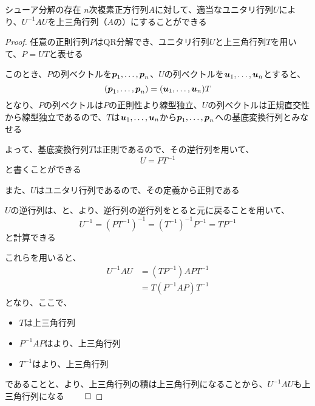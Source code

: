 \documentclass[../../../topic_linear-algebra]{subfiles}
\begin{document}
\begin{theorem*}{シューア分解の存在}
  $n$次複素正方行列$A$に対して、適当なユニタリ行列$U$により、$U^{-1}AU$を上三角行列（$A$の）にすることができる
\end{theorem*}

\begin{proof}
  任意の正則行列$P$はQR分解でき、ユニタリ行列$U$と上三角行列$T$を用いて、$P = UT$と表せる

  このとき、$P$の列ベクトルを$\vb*{p}_1,\ldots,\vb*{p}_n$、$U$の列ベクトルを$\vb*{u}_1,\ldots,\vb*{u}_n$とすると、
  \begin{equation*}
    (\vb*{p}_1,\ldots,\vb*{p}_n) = (\vb*{u}_1,\ldots,\vb*{u}_n) T
  \end{equation*}
  となり、$P$の列ベクトルは$P$の正則性より線型独立、$U$の列ベクトルは正規直交性から線型独立であるので、$T$は$\vb*{u}_1,\ldots,\vb*{u}_n$から$\vb*{p}_1,\ldots,\vb*{p}_n$への基底変換行列とみなせる

  よって、基底変換行列$T$は正則であるので、その逆行列を用いて、
  \begin{equation*}
    U = P T^{-1}
  \end{equation*}
  と書くことができる

  \br

  また、$U$はユニタリ行列であるので、その定義から正則である

  $U$の逆行列は、と、より、逆行列の逆行列をとると元に戻ることを用いて、
  \begin{equation*}
    U^{-1} =(P T^{-1})^{-1} = (T^{-1})^{-1} P^{-1} = T P^{-1}
  \end{equation*}
  と計算できる

  \br

  これらを用いると、
  \begin{align*}
    U^{-1}AU & = (T P^{-1})A P T^{-1} \\
             & = T (P^{-1}AP) T^{-1}
  \end{align*}
  となり、ここで、
  \begin{itemize}
    \item $T$は上三角行列
    \item $P^{-1}AP$はより、上三角行列
    \item $T^{-1}$はより、上三角行列
  \end{itemize}
  であることと、より、上三角行列の積は上三角行列になることから、$U^{-1}AU$も上三角行列になる $\qed$
\end{proof}
\end{document}
